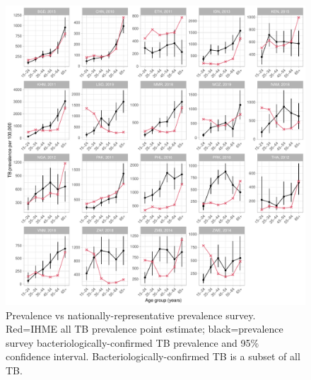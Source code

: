 \documentclass[12pt]{article}
\begin{document}
\FloatBarrier




\FloatBarrier

\begin{figure}
\centering
\includegraphics[width=1\textwidth]{../plots/aF3.pdf}
\caption[Prevalence vs prevalence survey.]{Prevalence vs
  nationally-representative prevalence survey. Red=IHME all TB prevalence point
  estimate; black=prevalence survey bacteriologically-confirmed TB prevalence
  and 95\% confidence interval. Bacteriologically-confirmed TB is a subset of
  all TB.}
\end{figure}

\FloatBarrier
\end{document}
